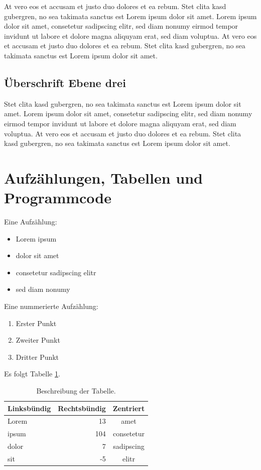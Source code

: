 At vero eos et accusam et justo duo dolores et ea rebum. Stet clita kasd gubergren, no sea takimata sanctus est Lorem ipsum dolor sit amet. Lorem ipsum dolor sit amet, consetetur sadipscing elitr, sed diam nonumy eirmod tempor invidunt ut labore et dolore magna aliquyam erat, sed diam voluptua. At vero eos et accusam et justo duo dolores et ea rebum. Stet clita kasd gubergren, no sea takimata sanctus est Lorem ipsum dolor sit amet.

\subsection{Überschrift Ebene drei}

Stet clita kasd gubergren, no sea takimata sanctus est Lorem ipsum dolor sit amet. Lorem ipsum dolor sit amet, consetetur sadipscing elitr, sed diam nonumy eirmod tempor invidunt ut labore et dolore magna aliquyam erat, sed diam voluptua. At vero eos et accusam et justo duo dolores et ea rebum. Stet clita kasd gubergren, no sea takimata sanctus est Lorem ipsum dolor sit amet.

\section{Aufzählungen, Tabellen und Programmcode}

Eine Aufzählung:

\begin{itemize}
\item Lorem ipsum
\item dolor sit amet
\item consetetur sadipscing elitr
\item sed diam nonumy
\end{itemize}
Eine nummerierte Aufzählung:

\begin{enumerate}
\item Erster Punkt
\item Zweiter Punkt
\item Dritter Punkt
\end{enumerate}
Es folgt Tabelle \ref{beispieltabelle}.

\begin{table}[htbp]
\centering
\begin{tabular}{lrc}
\toprule
Linksbündig & Rechtsbündig & Zentriert \\
\midrule
Lorem &  13 & amet \\ \addlinespace
ipsum & 104 & consetetur \\ \addlinespace
dolor &   7 & sadipscing \\ \addlinespace
sit   &  -5 & elitr \\
\bottomrule
\end{tabular}
\caption{Beschreibung der Tabelle.}
\label{beispieltabelle}
\end{table}

